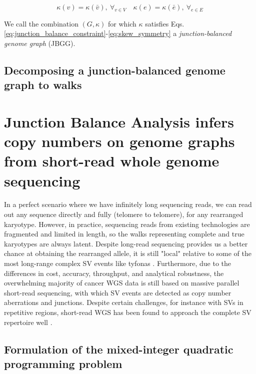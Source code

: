 \documentclass[phd,tocprelim]{cornell}
\begin{document}
\begin{equation}
    \label{eq:skew_symmetry}
\kappa(v) = \kappa(\bar{v}),\ \forall_{v \in V} \quad \kappa(e) = \kappa(\bar{e}),\ \forall_{e \in E} 
\end{equation}

We call the combination $(G,\kappa)$ for which $\kappa$ satisfies Eqs. \ref{eq:junction_balance_constraint}-\ref{eq:skew_symmetry} a \textit{junction-balanced genome graph} (JBGG).




\subsection{Decomposing a junction-balanced genome graph to walks}

\section{Junction Balance Analysis infers copy numbers on genome graphs from short-read whole genome sequencing}

In a perfect scenario where we have infinitely long sequencing reads, we can read out any sequence directly and fully (telomere to telomere), for any rearranged karyotype. However, in practice, sequencing reads from existing technologies are fragmented and limited in length, so the walks representing complete and true karyotypes are always latent. Despite long-read sequencing provides us a better chance at obtaining the rearranged allele, it is still "local" relative to some of the most long-range complex SV events like tyfonas \cite{Hadi2020-um}. Furthermore, due to the differences in cost, accuracy, throughput, and analytical robustness, the overwhelming majority of cancer WGS data is still based on massive parallel short-read sequencing, with which SV events are detected as copy number aberrations and junctions. Despite certain challenges, for instance with SVs in repetitive regions, short-read WGS has been found to approach the complete SV repertoire well \cite{Behr2021-gf}.

\subsection{Formulation of the mixed-integer quadratic programming problem}
\end{document}
